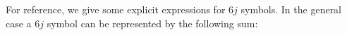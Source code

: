 For reference, we give some explicit expressions for $6j$ symbols. In the general case a $6j$ symbol can be represented by the following sum:
